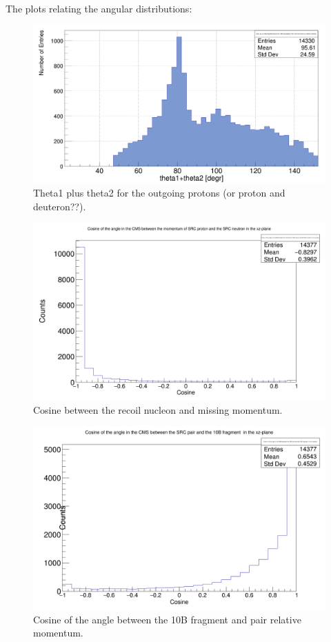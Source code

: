 \documentclass{report}
\begin{document}
The plots relating the angular distributions:\newline
\begin{figure}[!htb]
  \includegraphics[width=\linewidth]{theta1_plus_theta2_src.png}
  \caption{Theta1 plus theta2 for the outgoing protons (or proton and deuteron??).}
  \label{fig:theta1_theta2_distr}
\end{figure}
\newline
\begin{figure}[!htb]
  \includegraphics[width=\linewidth]{cos_src_pair.png}
  \caption{Cosine between the recoil nucleon and missing momentum.}
\end{figure}
\newline
\begin{figure}[!htb]
  \includegraphics[width=\linewidth]{cos_src_pair_vs_10B.png}
  \caption{Cosine of the angle between the 10B fragment and pair relative momentum.}
  \label{fig:factorization}
\end{figure}
\newline
\newpage
\end{document}
